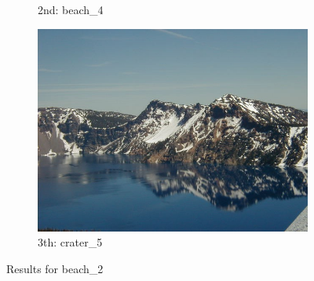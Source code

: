 \documentclass[10pt, a4paper]{article}
\begin{document}
\begin{itemize}
\begin{figure}[H]
\begin{subfigure}{0.25\textwidth}
        \caption{2nd: beach\_4}
    \end{subfigure}%
    \begin{subfigure}{0.25\textwidth}
	  \centering
	  \includegraphics[width=0.9\linewidth]{../input/crater_5.jpg}
	    \caption{3th: crater\_5}
	\end{subfigure}
    \caption{Results for beach\_2}
    \label{fig:results_beach_2}
\end{figure}


\end{itemize}
\end{document}
